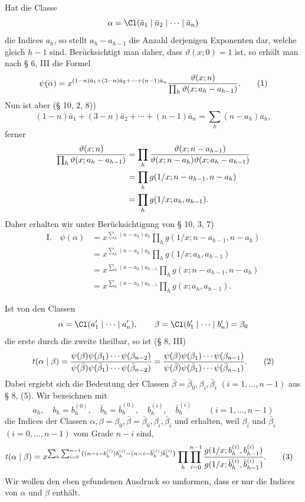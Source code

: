 Hat die Classe
\[
 \alpha=\Cl(\bar a_1\mid\bar a_2\mid\cdots\mid\bar a_n)
\]
die Indices $a_h$, so stellt $a_h-a_{h-1}$ die Anzahl derjenigen Exponenten dar, welche gleich $h-1$ sind. Berücksichtigt man daher, dass $\vartheta(x;0)=1$ ist, so erhält man nach § 6, III die Formel
\begin{equation}
 \psi(\alpha)=x^{(1-n)\bar a_1+(3-n)\bar a_2+\cdots+(n-1)\bar a_n}
 {\vartheta(x;n)\over\prod_h\vartheta(x;a_h-a_{h-1})}.
\tag{1}
\end{equation}
Nun ist aber (§ 10, 2, 8))
\[
 (1-n)\bar a_1+(3-n)\bar a_2+\cdots+(n-1)\bar a_n=\sum_h(n-a_h)a_h,
\]
ferner
\begin{align*}
 {\vartheta(x;n)\over\prod_h\vartheta(x;a_h-a_{h-1})}
 &=\prod_h {\vartheta(x;n-a_{h-1})\over\vartheta(x;n-a_h)\vartheta(x;a_h-a_{h-1})}\\
 &=\prod_h g(1/x;n-a_{h-1},n-a_h)\\
 &=\prod_h g(1/x;a_h,a_{h-1}).
\end{align*}
Daher erhalten wir unter Berücksichtigung von § 10, 3, 7)
\begin{align*}
\text{I.}\quad
\psi(\alpha)&=x^{\sum_h(n-a_h)a_h}\prod_h g(1/x;n-a_{h-1},n-a_h)\\
&=x^{\sum_h(n-a_h)a_h}\prod_h g(1/x;a_h,a_{h-1})\\
&=x^{\sum_h(n-a_h)a_{h-1}}\prod_h g(x;n-a_{h-1},n-a_h)\\
&=x^{\sum_h(n-a_h)a_{h-1}}\prod_h g(x;a_h,a_{h-1}).
\end{align*}

Ist von den Classen
\[
 \alpha=\Cl(a'_1\mid\cdots\mid a'_n),\qquad
 \beta=\Cl(b'_1\mid\cdots\mid b'_n)=\beta_0
\]
die erste durch die zweite theilbar, so ist (§ 8, III)
\begin{equation}
 t(\alpha\mid\beta)=
 {\psi(\beta)\psi(\beta_1)\cdots\psi(\beta_{n-2})
  \over
  \psi(\bar\beta)\psi(\bar\beta_1)\cdots\psi(\bar\beta_{n-2})}
 = {\psi(\beta)\psi(\beta_1)\cdots\psi(\beta_{n-1})
  \over
  \psi(\bar\beta)\psi(\bar\beta_1)\cdots\psi(\bar\beta_{n-1})}.
\tag{2}
\end{equation}
Dabei ergiebt sich die Bedeutung der Classen $\bar\beta=\bar\beta_0,\beta_i,\bar\beta_i$ $(i=1,\ldots,n-1)$ aus § 8, (5). Wir bezeichnen mit
\[
 a_h,
 \quad b_h=b_h^{(0)},\quad \bar b_h=\bar b_h^{(0)},
 \quad b_h^{(i)},\quad \bar b_h^{(i)}\qquad(i=1,\ldots,n-1)
\]
die Indices der Classen $\alpha,\beta=\beta_0,\bar\beta=\bar\beta_0,\beta_i,\bar\beta_i$ und erhalten, weil $\beta_i$ und $\bar\beta_i$ $(i=0,\ldots,n-1)$ vom Grade $n-i$ sind,
\begin{align}
 t(\alpha\mid\beta)
&=x^{\sum_h\sum_{i=0}^{n-1}\{(n-i-b_h^{(i)})b_h^{(i)}-(n-i-\bar b_h^{(i)})\bar b_h^{(i)}\}}
 \prod_h\prod_{i=0}^{n-1}
 {g(1/x;b_h^{(i)},b_{h-1}^{(i)})\over
 g(1/x;\bar b_h^{(i)},\bar b_{h-1}^{(i)})}.
\tag{3}
\end{align}
Wir wollen den eben gefundenen Ausdruck so umformen, dass er nur die Indices von $\alpha$ und $\beta$ enthält.

